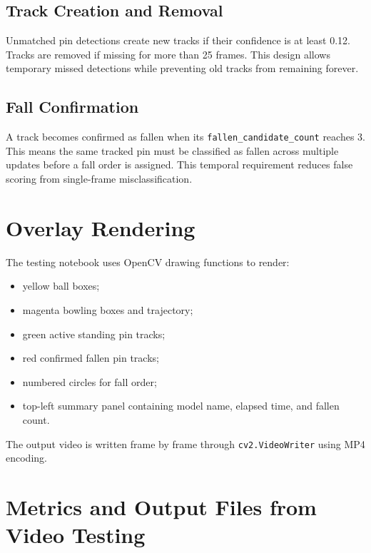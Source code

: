 \documentclass[12pt,a4paper]{article}
\begin{document}
\subsection{Track Creation and Removal}

Unmatched pin detections create new tracks if their confidence is at least 0.12. Tracks are removed if missing for more than 25 frames. This design allows temporary missed detections while preventing old tracks from remaining forever.

\subsection{Fall Confirmation}

A track becomes confirmed as fallen when its \texttt{fallen\_candidate\_count} reaches 3. This means the same tracked pin must be classified as fallen across multiple updates before a fall order is assigned. This temporal requirement reduces false scoring from single-frame misclassification.

\section{Overlay Rendering}

The testing notebook uses OpenCV drawing functions to render:
\begin{itemize}[noitemsep]
    \item yellow ball boxes;
    \item magenta bowling boxes and trajectory;
    \item green active standing pin tracks;
    \item red confirmed fallen pin tracks;
    \item numbered circles for fall order;
    \item top-left summary panel containing model name, elapsed time, and fallen count.
\end{itemize}

The output video is written frame by frame through \texttt{cv2.VideoWriter} using MP4 encoding.

\section{Metrics and Output Files from Video Testing}
\end{document}
